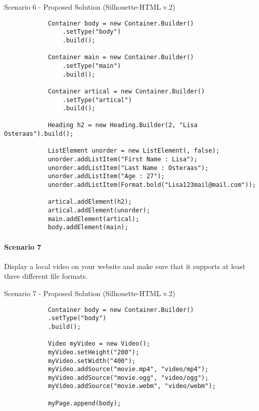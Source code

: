 \documentclass[12pt]{article}
\begin{document}
        \begin{shaded}
            Scenario 6 - Proposed Solution (Silhouette-HTML v.2)
            \begin{lstlisting}
            Container body = new Container.Builder()
                .setType("body")
                .build();

            Container main = new Container.Builder()
                .setType("main")
                .build();

            Container artical = new Container.Builder()
                .setType("artical")
                .build();

            Heading h2 = new Heading.Builder(2, "Lisa Osteraas").build();
                                        
            ListElement unorder = new ListElement(, false);
            unorder.addListItem("First Name : Lisa");
            unorder.addListItem("Last Name : Osteraas");
            unorder.addListItem("Age : 27");
            unorder.addListItem(Format.bold("Lisa123mail@mail.com"));

            artical.addElement(h2);
            artical.addElement(unorder);
            main.addElement(artical);
            body.addElement(main);
            \end{lstlisting}
        \end{shaded}

        \paragraph{Scenario 7}
        Display a local video on your website and make sure that it supports at least three different file formats.

        \begin{shaded}
            Scenario 7 - Proposed Solution (Silhouette-HTML v.2)
            \begin{lstlisting}
            Container body = new Container.Builder()
            .setType("body")
            .build();

            Video myVideo = new Video();
            myVideo.setHeight("200");
            myVideo.setWidth("400");
            myVideo.addSource("movie.mp4", "video/mp4");
            myVideo.addSource("movie.ogg", "video/ogg");
            myVideo.addSource("movie.webm", "video/webm");

            myPage.append(body);
            \end{lstlisting}
        \end{shaded}
\end{document}
